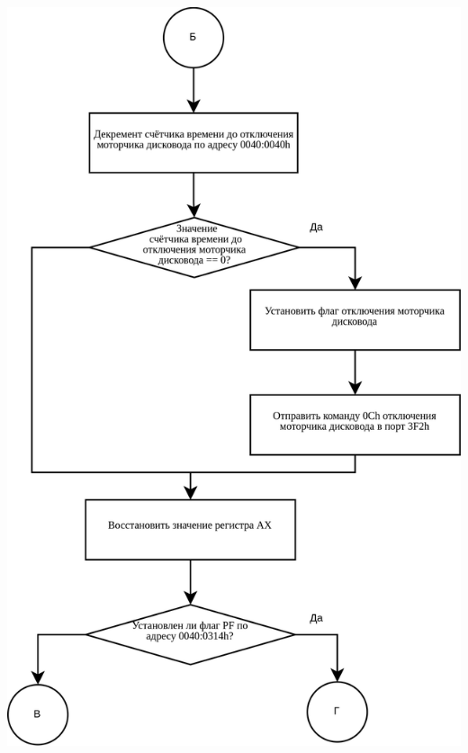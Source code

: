 \documentclass[a4paper,12pt]{article}
\begin{document}
\begin{flushright}
	\includegraphics[height=\textheight]{flowchart/int_8h_3.png}

\end{flushright}
\end{document}
